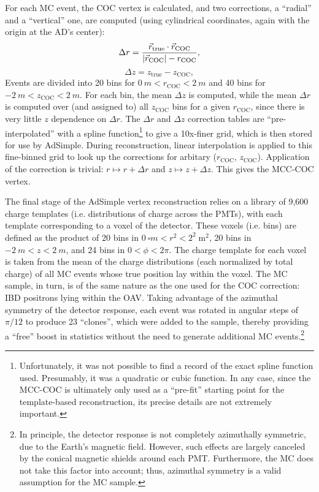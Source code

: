 \documentclass[../thesis.tex]{subfiles}
\begin{document}
For each MC event, the COC vertex is calculated, and two corrections, a ``radial'' and a ``vertical'' one, are computed (using cylindrical coordinates, again with the origin at the AD's center):
\begin{equation}
  \Delta r = \frac{\vec{r}_{\mathrm{true}} \cdot \vec{r}_{\mathrm{COC}}}{\lvert \vec{r}_{\mathrm{COC}}\rvert - r_{\mathrm{COC}}},
\end{equation}
\begin{equation}
  \Delta z = z_{\mathrm{true}} - z_{\mathrm{COC}},
\end{equation}
Events are divided into 20 bins for $\SI{0}{m} < r_{\mathrm{COC}} < \SI{2}{m}$ and 40 bins for $\SI{-2}{m} < z_{\mathrm{COC}} < \SI{2}{m}$. For each bin, the mean $\Delta z$ is computed, while the mean $\Delta r$ is computed over (and assigned to) all $z{_\mathrm{COC}}$ bins for a given $r_{\mathrm{COC}}$, since there is very little $z$ dependence on $\Delta r$. The $\Delta r$ and $\Delta z$ correction tables are ``pre-interpolated'' with a spline function\footnote{Unfortunately, it was not possible to find a record of the exact spline function used. Presumably, it was a quadratic or cubic function. In any case, since the MCC-COC is ultimately only used as a ``pre-fit'' starting point for the template-based reconstruction, its precise details are not extremely important.} to give a 10x-finer grid, which is then stored for use by AdSimple. During reconstruction, linear interpolation is applied to this fine-binned grid to look up the corrections for arbitary ($r_{\mathrm{COC}}$, $z_{\mathrm{COC}}$). Application of the correction is trivial: $r \mapsto r + \Delta r$ and $z \mapsto z + \Delta z$. This gives the MCC-COC vertex.

The final stage of the AdSimple vertex reconstruction relies on a library of 9,600 charge templates (i.e. distributions of charge across the PMTs), with each template corresponding to a voxel of the detector. These voxels (i.e. bins) are defined as the product of 20 bins in $\SI{0}{\square m} < r^2 < 2^2\;\mathrm{m}^2$, 20 bins in $\SI{-2}{m} < z < \SI{2}{m}$, and 24 bins in $0 < \phi < 2\pi$. The charge template for each voxel is taken from the mean of the charge distributions (each normalized by total charge) of all MC events whose true position lay within the voxel. The MC sample, in turn, is of the same nature as the one used for the COC correction: IBD positrons lying within the OAV. Taking advantage of the azimuthal symmetry of the detector response, each event was rotated in angular steps of $\pi/12$ to produce 23 ``clones'', which were added to the sample, thereby providing a ``free'' boost in statistics without the need to generate additional MC events.\footnote{In principle, the detector response is not completely azimuthally symmetric, due to the Earth's magnetic field. However, such effects are largely canceled by the conical magnetic shields around each PMT. Furthermore, the MC does not take this factor into account; thus, azimuthal symmetry is a valid assumption for the MC sample.}
\end{document}
